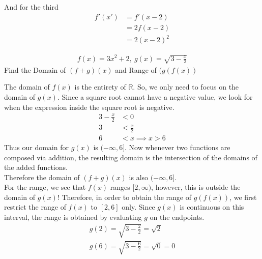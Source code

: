 \documentclass[a4paper]{article}
\begin{document}
And for the third 
\begin{align*}
f'(x') &= f'(x-2) \\
    &= 2f(x-2) \\
    &= 2(x-2)^2
\end{align*}

\begin{center}
\end{center}


\begin{question}{}{}
\begin{align*}
f(x) = 3x^2 + 2, \ g(x) = \sqrt{3 - \frac{x}{2}}
\end{align*}
Find the Domain of \((f+g)(x)\) and Range of \((g(f(x))\)
\end{question}
The domain of \(f(x)\) is the entirety of \(\mathbb{R}\). So, we only need to focus on the domain of \(g(x)\). Since a square root cannot have a negative value, we look for when the expression inside the square root is negative.
\begin{align*}
3 - \frac{x}{2} &< 0 \\
3 &< \frac{x}{2} \\
6 &< x \implies x > 6
\end{align*}
Thus our domain for \(g(x)\) is \((-\infty, 6]\). Now whenever two functions are composed via addition, the resulting domain is the intersection of the domains of the added functions. \\

Therefore the domain of \((f+g)(x)\) is also \((-\infty, 6]\). \\

For the range, we see that \(f(x)\) ranges \([2, \infty)\), however, this is outside the domain of \(g(x)\)! Therefore, in order to obtain the range of \(g(f(x))\), we first restrict the range of \(f(x)\) to \([2, 6]\) only. Since \(g(x)\) is continuous on this interval, the range is obtained by evaluating \(g\) on the endpoints.
\begin{align*}
g(2) = \sqrt{3 - \frac{2}{2}} = \sqrt{2} \\
g(6) = \sqrt{3 - \frac{6}{2}} = \sqrt{0} = 0 \\
\end{align*}
\end{document}
